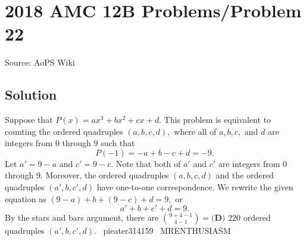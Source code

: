 \documentclass[12pt]{article}
\begin{document}
\section*{{2018 AMC 12B Problems/Problem 22}}
Source: AoPS Wiki

\subsection*{Solution}
Suppose that $P(x)=ax^3+bx^2+cx+d.$ This problem is equivalent to counting the ordered quadruples $(a,b,c,d),$ where all of $a,b,c,$ and $d$ are integers from $0$ through $9$ such that \[P(-1)=-a+b-c+d=-9.\] Let $a'=9-a$ and $c'=9-c.$ Note that both of $a'$ and $c'$ are integers from $0$ through $9.$ Moreover, the ordered quadruples $(a,b,c,d)$ and the ordered quadruples $(a',b,c',d)$ have one-to-one correspondence. We rewrite the given equation as $(9-a)+b+(9-c)+d=9,$ or \[a'+b+c'+d=9.\] By the stars and bars argument, there are $\binom{9+4-1}{4-1}=\boxed{\textbf{(D) } 220}$ ordered quadruples $(a',b,c',d).$ ~pieater314159 ~MRENTHUSIASM
\end{document}
